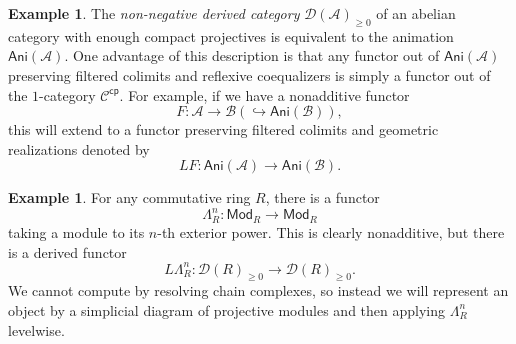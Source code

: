 \documentclass[10pt]{amsart}
\theoremstyle{definition}
\newtheorem{exm}[thm]{Example}
\theoremstyle{remark}
\theoremstyle{plain}
\theoremstyle{definition}
\theoremstyle{remark}
\newcommand{\mc}[1]{\mathcal{#1}}
\newcommand{\ms}[1]{\mathsf{#1}}
\newcommand{\1}{\mathbf{1}}
\newcommand{\2}{\mathbf{2}}
\newcommand{\3}{\mathbf{3}}
\begin{document}
\begin{exm}
    The \textit{non-negative derived category} $\mc{D}(\mc{A})_{\geq 0}$ of an abelian category with enough compact projectives is equivalent to the animation $\ms{Ani}(\mc{A})$. One advantage of this description is that any functor out of $\ms{Ani}(\mc{A})$ preserving filtered colimits and reflexive coequalizers is simply a functor out of the $1$-category $\mc{C}^{\ms{cp}}$. For example, if we have a nonadditive functor
    \[ F \colon \mc{A} \to \mc{B} (\hookrightarrow \ms{Ani}(\mc{B})), \]
    this will extend to a functor preserving filtered colimits and geometric realizations denoted by
    \[ LF \colon \ms{Ani}(\mc{A}) \to \ms{Ani}(\mc{B}). \]
\end{exm}

\begin{exm}
    For any commutative ring $R$, there is a functor
    \[ \Lambda_R^{n} \colon \ms{Mod}_R \to \ms{Mod}_R \]
    taking a module to its $n$-th exterior power. This is clearly nonadditive, but there is a derived functor
    \[ L \Lambda_R^n \colon \mc{D}(R)_{\geq 0} \to \mc{D}(R)_{\geq 0}. \]
    We cannot compute by resolving chain complexes, so instead we will represent an object by a simplicial diagram of projective modules and then applying $\Lambda_R^n$ levelwise.


\end{exm}
\end{document}
